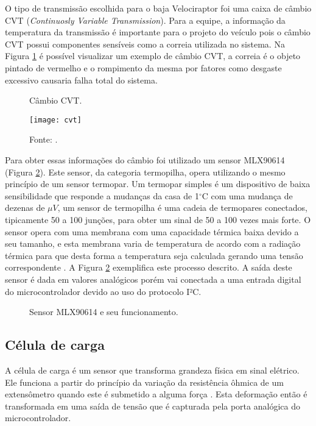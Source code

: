 O tipo de transmissão escolhida para o baja Velociraptor foi uma caixa de câmbio CVT (\textit{Continuosly Variable Transmission}). Para a equipe, a informação da temperatura da transmissão é importante para o projeto do veículo pois o câmbio CVT possui componentes sensíveis como a correia utilizada no sistema. Na Figura \ref{fig:cvt} é possível visualizar um exemplo de câmbio CVT, a correia é o objeto pintado de vermelho e o rompimento da mesma por fatores como desgaste excessivo causaria falha total do sistema. 

\begin{figure}[!htb]
	\centering
		\caption{Câmbio CVT.}
		\texttt{[image: cvt]} 
		\caption*{Fonte: \cite{cvt}.}
		\label{fig:cvt}
\end{figure} 

Para obter essas informações do câmbio foi utilizado um sensor MLX90614 (Figura \ref{fig:sensorCvt}). Este sensor, da categoria termopilha, opera utilizando o mesmo princípio de um sensor termopar. Um termopar simples é um dispositivo de baixa sensibilidade que responde a mudanças da casa de 1$^\circ$C com uma mudança de dezenas de $\mu V$, um sensor de termopilha é uma cadeia de termopares conectados, tipicamente 50 a 100 junções, para obter um sinal de 50 a 100 vezes mais forte. O sensor opera com uma membrana com uma capacidade térmica baixa devido a seu tamanho, e esta membrana varia de temperatura de acordo com a radiação térmica para que desta forma a temperatura seja calculada gerando uma tensão correspondente \cite{Fraden2016}. A Figura \ref{fig:sensorCvt} exemplifica este processo descrito. A saída deste sensor é dada em valores analógicos porém vai conectada a uma entrada digital do microcontrolador devido ao uso do protocolo I²C.       

\begin{figure}[!htb]
	\center
	\caption{Sensor MLX90614 e seu funcionamento.}
	\qquad
	\label{fig:sensorCvt}
\end{figure}

\subsection{Célula de carga}
A célula de carga é um sensor que transforma grandeza física em sinal elétrico. Ele funciona a partir do princípio da variação da resistência ôhmica de um extensômetro quando este é submetido a alguma força \cite{Fraden2016}. Esta deformação então é transformada em uma saída de tensão que é capturada pela porta analógica do microcontrolador.

